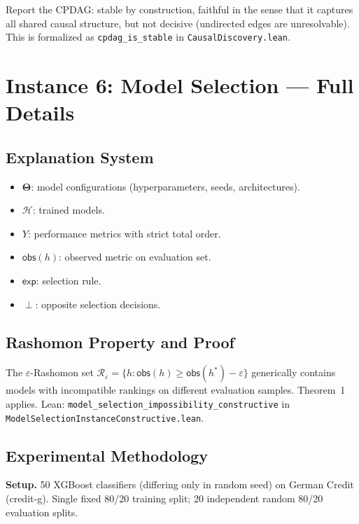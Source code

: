\documentclass{article}
\newcommand{\Params}{\mathbf{\Theta}}
\newcommand{\sH}{\mathcal{H}}
\newcommand{\incomp}{\perp}
\begin{document}
Report the CPDAG: stable by construction, faithful in the sense that it captures all shared causal structure, but not decisive (undirected edges are unresolvable).  This is formalized as \texttt{cpdag\_is\_stable} in \texttt{CausalDiscovery.lean}.

\section{Instance 6: Model Selection --- Full Details}
\label{sec:ms-full}

\subsection{Explanation System}

\begin{itemize}
  \item $\Params$: model configurations (hyperparameters, seeds, architectures).
  \item $\sH$: trained models.
  \item $Y$: performance metrics with strict total order.
  \item $\mathsf{obs}(h)$: observed metric on evaluation set.
  \item $\mathsf{exp}$: selection rule.
  \item $\incomp$: opposite selection decisions.
\end{itemize}

\subsection{Rashomon Property and Proof}

The $\varepsilon$-Rashomon set $\mathcal{R}_\varepsilon = \{h : \mathsf{obs}(h) \geq \mathsf{obs}(h^*) - \varepsilon\}$ generically contains models with incompatible rankings on different evaluation samples.  Theorem~1 applies.  Lean: \texttt{model\_selection\_impossibility\_constructive} in \texttt{ModelSelectionInstanceConstructive.lean}.

\subsection{Experimental Methodology}

\textbf{Setup.}  50 XGBoost classifiers (differing only in random seed) on German Credit (credit-g).  Single fixed 80/20 training split; 20 independent random 80/20 evaluation splits.
\end{document}
